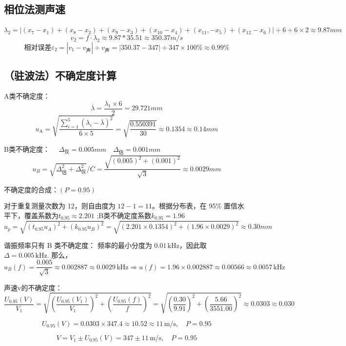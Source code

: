 \documentclass[12pt,a4paper]{article}
\begin{document}
		\subsection{相位法测声速}
			$\lambda_{2}=|(x_{7}-x_{1})+(x_{8}-x_{2})+(x_{9}-x_{3})+(x_{10}-x_{4})+(x_{11},-x_{5})+(x_{12}-x_{6})|\div6\div6\times 2 \approx 9.87 mm$
			$$v_{2} = f \cdot \lambda_{2} \approx 9.87*35.51 \approx 350.37 m/s$$
			$$相对误差\varepsilon_{2}=|v_1-v_{声}| \div v_{声} = |350.37-347| \div 347 \times 100 \% \approx 0.99\% $$

		\subsection{（驻波法）不确定度计算}
		A类不确定度：
			$$\overline{\lambda}=  \frac{\lambda_{1} \times 6}{2} = 29.721 mm$$
			$$u_{\mathrm{A}} = \sqrt{\frac {\sum_{i=1}^{5}(\lambda_{i}-\overline{\lambda})^2}{6 \times 5}} = \sqrt{\frac{0.550391}{30}} \approx 0.1354 \approx 0.14 mm$$

		B类不确定度：
			$\quad \Delta_{\text{仪}} = 0.005 mm \quad \Delta_{\text{估}} = 0.001 mm $
			\[u_B=\sqrt{\Delta_{\text{估}}^2+\Delta_{\text{仪}}^2}/C=\frac{\sqrt{(0.005)^{2}+(0.001)^{2}}}{\sqrt{3}} \approx 0.0029 mm \]

		不确定度的合成：$(P=0.95)$
			
			对于重复测量次数为 12，则自由度为 \(12-1=11\)。根据分布表，在 95\% 置信水平下，覆盖系数为$t_{0.95} \approx 2.201$ ;\quad B类不确定度系数$k_{0.95}=1.96$
			$$u_{p}=\sqrt{(t_{0.95}u_{A})^{2}+(k_{0.95}u_{B})^{2}}=\sqrt{(2.201 \times 0.1354 )^{2}+(1.96\times0.0029)^{2}} \approx 0.30 mm$$

			谐振频率只有 B 类不确定度：
			频率的最小分度为 \(0.01\,\text{kHz}\)，因此取$\Delta = 0.005\,\text{kHz}$.
			那么，
			\[
			u_B(f) = \frac{0.005}{\sqrt{3}} \approx 0.002887 \approx 0.0029\,\text{kHz} \Rightarrow u(f) =1.96 \times 0.002887 \approx 0.00566 \approx 0.0057\,\text{kHz}
			\]

			声速v的不确定度：
			\[
			\frac{U_{0.95}(V)}{V_1} = \sqrt{\left(\frac{U_{0.95}(V_1)}{V_1}\right)^2 + \left(\frac{U_{0.95}(f)}{f}\right)^2} = \sqrt{\left(\frac{0.30}{9.91}\right)^2 + \left(\frac{5.66}{3551.00}\right)^2} \approx 0.0303 \approx 0.030
			\]


			\[
			U_{0.95}(V) = 0.0303 \times 347.4 \approx 10.52 \approx 11 \, \text{m/s},\quad P = 0.95 
			\]

			\[
			V = V_1 \pm U_{0.95}(V) = 347 \pm 11 \, \text{m/s},\quad P = 0.95 
			\]
\end{document}
